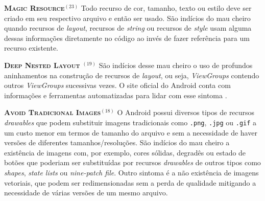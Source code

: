   \noindent
  \textbf{\textsc{{\small Magic Resource}}}$^{(23)}$
      Todo recurso de cor, tamanho, texto ou estilo deve ser criado em seu respectivo arquivo e então ser usado. São indícios do mau cheiro quando recursos de \textit{layout}, recursos de \textit{string} ou recursos de \textit{style} usam alguma dessas informações diretamente no código ao invés de fazer referência para um recurso existente.



  \noindent
  \textbf{\textsc{{\small Deep Nested Layout
}}}$^{(19)}$
      São indícios desse mau cheiro o uso de profundos aninhamentos na construção de recursos de \textit{layout}, ou seja, \textit{ViewGroups} contendo outros \textit{ViewGroups} sucessivas vezes. O site oficial do Android conta com informações e ferramentas automatizadas para lidar com esse sintoma \cite{OptmizingViewHierarchies}.


  \noindent
  \textbf{\textsc{{\small Avoid Tradicional Images}}}$^{(18)}$
      O Android possui diversos tipos de recursos \textit{drawables} que podem substituir imagens tradicionais como \texttt{.png}, \texttt{.jpg} ou \texttt{.gif} a um custo menor em termos de tamanho do arquivo e sem a necessidade de haver versões de diferentes tamanhos/resoluções. São indícios do mau cheiro a existência de imagens com, por exemplo, cores sólidas, degradês ou estado de botões que poderiam ser substituídas por recursos \textit{drawables} de outros tipos como \textit{shapes}, \textit{state lists} ou \textit{nine-patch file}. Outro sintoma é a não existência de imagens vetoriais, que podem ser redimensionadas sem a perda de qualidade mitigando a necessidade de várias versões de um mesmo arquivo.

